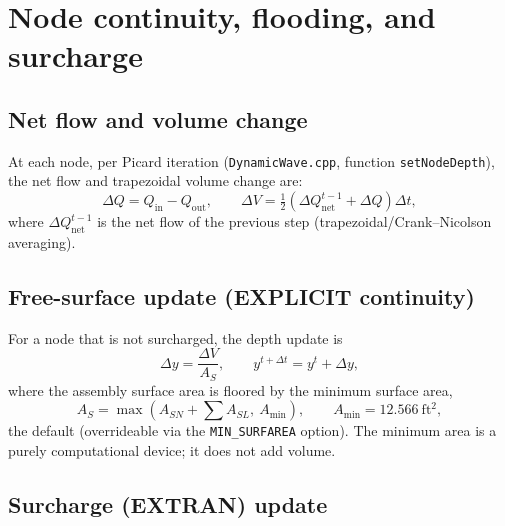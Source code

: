 \documentclass[11pt,a4paper]{article}
\newcommand{\sfft}{\mathrm{ft^2}}
\begin{document}
\section{Node continuity, flooding, and surcharge}
\label{sec:node-cont}

\subsection{Net flow and volume change}

At each node, per Picard iteration (\texttt{DynamicWave.cpp}, function
\texttt{setNodeDepth}), the net flow and trapezoidal volume change are:
\begin{equation}
  \Delta Q = Q_{\mathrm{in}} - Q_{\mathrm{out}}, \qquad
  \Delta V = \tfrac{1}{2}\left(\Delta Q_{\mathrm{net}}^{t-1} + \Delta Q\right)
  \Delta t,
\end{equation}
where $\Delta Q_{\mathrm{net}}^{t-1}$ is the net flow of the previous step
(trapezoidal/Crank--Nicolson averaging).

\subsection{Free-surface update (EXPLICIT continuity)}

For a node that is not surcharged, the depth update is
\begin{equation}
  \Delta y = \frac{\Delta V}{A_S}, \qquad
  y^{t+\Delta t} = y^{t} + \Delta y,
\end{equation}
where the assembly surface area is floored by the minimum surface area,
\begin{equation}
  A_S = \max\left(A_{SN} + \sum A_{SL},\ A_{\min}\right),
  \qquad A_{\min} = 12.566\ \sfft,
\end{equation}
the default (overrideable via the \texttt{MIN\_SURFAREA} option).
The minimum area is a purely computational device; it does not add volume.

\subsection{Surcharge (EXTRAN) update}
\end{document}
